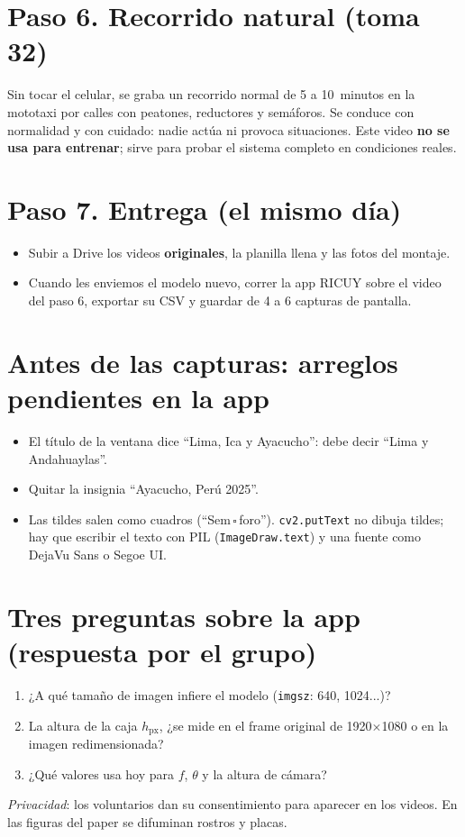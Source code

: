 \documentclass[10pt,a4paper]{article}
\begin{document}
\section*{Paso 6. Recorrido natural (toma 32)}
Sin tocar el celular, se graba un recorrido normal de 5 a 10~minutos en la mototaxi por calles con peatones,
reductores y semáforos. Se conduce con normalidad y con cuidado: nadie actúa ni provoca situaciones. Este video
\textbf{no se usa para entrenar}; sirve para probar el sistema completo en condiciones reales.

\section*{Paso 7. Entrega (el mismo día)}
\begin{itemize}
  \item Subir a Drive los videos \textbf{originales}, la planilla llena y las fotos del montaje.
  \item Cuando les enviemos el modelo nuevo, correr la app RICUY sobre el video del paso 6, exportar su CSV y
        guardar de 4 a 6 capturas de pantalla.
\end{itemize}

\section*{Antes de las capturas: arreglos pendientes en la app}
\begin{itemize}
  \item El título de la ventana dice ``Lima, Ica y Ayacucho'': debe decir ``Lima y Andahuaylas''.
  \item Quitar la insignia ``Ayacucho, Perú 2025''.
  \item Las tildes salen como cuadros (``Sem\,$\square$\,foro''). \texttt{cv2.putText} no dibuja tildes; hay que
        escribir el texto con PIL (\texttt{ImageDraw.text}) y una fuente como DejaVu Sans o Segoe UI.
\end{itemize}

\section*{Tres preguntas sobre la app (respuesta por el grupo)}
\begin{enumerate}
  \item ¿A qué tamaño de imagen infiere el modelo (\texttt{imgsz}: 640, 1024...)?
  \item La altura de la caja $h_\mathrm{px}$, ¿se mide en el frame original de 1920$\times$1080 o en la imagen
        redimensionada?
  \item ¿Qué valores usa hoy para $f$, $\theta$ y la altura de cámara?
\end{enumerate}

\textit{Privacidad}: los voluntarios dan su consentimiento para aparecer en los videos. En las figuras del paper
se difuminan rostros y placas.
\end{document}
